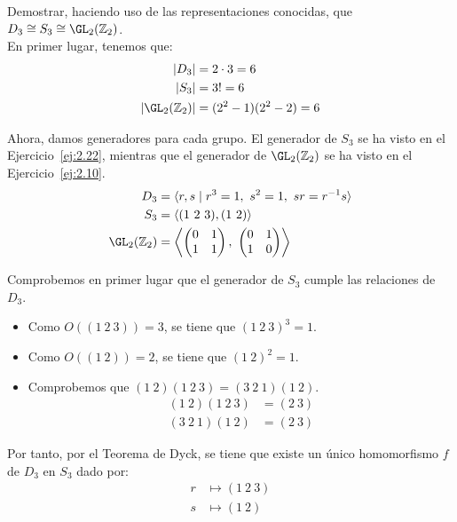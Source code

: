 \begin{ejercicio}\label{ej:2.28}
    Demostrar, haciendo uso de las representaciones conocidas, que $D_3 \cong S_3 \cong \GL_2(\mathbb{Z}_2)$.\\

    En primer lugar, tenemos que:
    \begin{align*}
        |D_3|&=2\cdot 3=6\\
        |S_3|&=3!=6\\
        |\GL_2(\mathbb{Z}_2)|&=(2^2-1)(2^2-2)=6
    \end{align*}

    Ahora, damos generadores para cada grupo. El generador de $S_3$ se ha visto en el Ejercicio~\ref{ej:2.22}, mientras que el generador de $\GL_2(\mathbb{Z}_2)$ se ha visto en el Ejercicio~\ref{ej:2.10}.
    \begin{align*}
        D_3 &= \langle r, s \mid r^3=1,\ s^2=1,\ sr=r^{-1}s \rangle\\
        S_3 &= \langle (1\ 2\ 3), (1\ 2) \rangle\\
        \GL_2(\mathbb{Z}_2) &= \left\langle\begin{pmatrix}0&1\\1&1\end{pmatrix},\ \begin{pmatrix}0&1\\1&0\end{pmatrix}\right\rangle
    \end{align*}

    Comprobemos en primer lugar que el generador de $S_3$ cumple las relaciones de $D_3$.
    \begin{itemize}
        \item Como $O((1\ 2\ 3))=3$, se tiene que $(1\ 2\ 3)^3=1$.
        \item Como $O((1\ 2))=2$, se tiene que $(1\ 2)^2=1$.
        \item Comprobemos que $(1\ 2)(1\ 2\ 3)=(3\ 2\ 1)(1\ 2)$.
        \begin{align*}
            (1\ 2)(1\ 2\ 3) &= (2\ 3)\\
            (3\ 2\ 1)(1\ 2) &= (2\ 3)
        \end{align*}
    \end{itemize}

    Por tanto, por el Teorema de Dyck, se tiene que existe un único homomorfismo $f$ de $D_3$ en $S_3$ dado por:
    \begin{align*}
        r &\mapsto (1\ 2\ 3)\\
        s &\mapsto (1\ 2)
    \end{align*}


\end{ejercicio}
